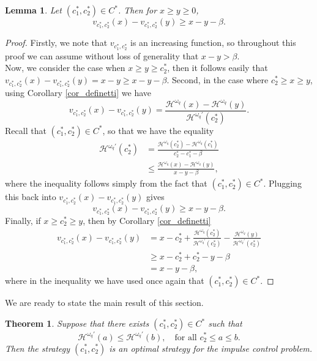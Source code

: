 \documentclass[11pt,reqno]{amsart}
\newtheorem{theorem}{Theorem}[section]
\newtheorem{lemma}{Lemma}[section]
\newcommand{\cH}{\mathcal{H}}
\newcommand{\homega}{\omega_q}
\renewcommand{\leq}{\leqslant}
\renewcommand{\geq}{\geqslant}
\begin{document}
\begin{lemma}\label{lem:HJB:1}
	Let $(c_1^\ast,c_2^\ast) \in C^\ast$. Then for $x \geq y \geq 0$,
	\begin{equation}\label{eq:lin:ineq}
		v_{c_1^\ast,c_2^\ast}(x) - v_{c_1^\ast,c_2^\ast}(y) \geq x - y -\beta.
	\end{equation}
\end{lemma}
\begin{proof}
	Firstly, we note that $v_{c_1^\ast,c_2^\ast}$ is an increasing function, so throughout this proof we can assume without loss of generality that $x - y > \beta$.\\
	Now, we consider the case when $x \geq y \geq c_2^\ast$, then it follows easily that $v_{c_1^\ast,c_2^\ast}(x) - v_{c_1^\ast,c_2^\ast}(y) = x-y \geq x-y-\beta$. Second, in the case where $c_2^\ast \geq x \geq y$, using Corollary \ref{cor_definetti} we have
	\[
	v_{c_1^\ast,c_2^\ast}(x) - v_{c_1^\ast,c_2^\ast}(y) = \frac{\cH^{\homega}(x) - \cH^{\homega}(y)}{\cH^{\homega\prime}(c_2^\ast)}.
	\]
	Recall that $(c_1^\ast,c_2^\ast) \in C^\ast$, so that we have the equality
	\begin{align*}
		\cH^{\homega\prime}(c_2^\ast) &= \frac{\cH^{\homega}(c_2^\ast) - \cH^{\homega}(c_1^\ast)}{c_2^\ast - c_1^\ast - \beta}\\
		&\leq \frac{\cH^{\homega}(x) - \cH^{\homega}(y)}{x - y - \beta},
	\end{align*}
	where the inequality follows simply from the fact that $(c_1^\ast,c_2^\ast) \in C^\ast$. Plugging this back into $v_{c_1^\ast,c_2^\ast}(x) - v_{c_1^\ast,c_2^\ast}(y)$ gives
	\[
	v_{c_1^\ast,c_2^\ast}(x) - v_{c_1^\ast,c_2^\ast}(y) \geq x - y -\beta.
	\]
	Finally, if $x \geq c_2^\ast \geq y$, then by Corollary \ref{cor_definetti}
	\begin{align*}
		v_{c_1^\ast,c_2^\ast}(x) - v_{c_1^\ast,c_2^\ast}(y) &= x - c_2^\ast + \frac{\cH^{\homega}(c_2^\ast)}{\cH^{\homega\prime}(c_2^\ast)} - \frac{\cH^{\homega}(y)}{\cH^{\homega\prime}(c_2^\ast)} \\
		& \geq x - c_2^\ast + c_2^\ast - y - \beta \\ &= x-y-\beta,
	\end{align*}
	where in the inequality we have used once again that $(c_1^\ast,c_2^\ast) \in C^\ast$.
\end{proof}
We are ready to state the main result of this section.
\begin{theorem}
	Suppose that there exists $(c_1^\ast,c_2^\ast) \in C^\ast$ such that
	\[
	\cH^{\homega\prime}(a) \leq \cH^{\homega\prime}(b), \quad \text{for all } c_2^\ast \leq a \leq b.
	\]
	Then the strategy $(c_1^\ast,c_2^\ast)$ is an optimal strategy for the impulse control problem.
\end{theorem}
\end{document}
